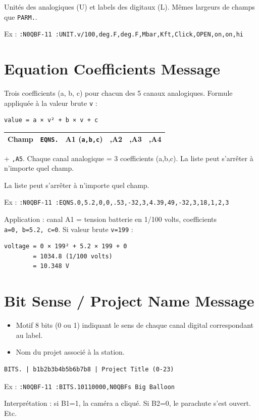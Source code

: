 Unités des analogiques (U) et labels des digitaux (L). Mêmes largeurs de
champs que \texttt{PARM.}.

Ex :
\texttt{:N0QBF-11\ :UNIT.v/100,deg.F,deg.F,Mbar,Kft,Click,OPEN,on,on,hi}

\section{Equation Coefficients
Message}\label{equation-coefficients-message}

Trois coefficients (a, b, c) pour chacun des 5 canaux analogiques.
Formule appliquée à la valeur brute \texttt{v} :

\begin{verbatim}
value = a × v² + b × v + c
\end{verbatim}

\begin{center}
\begin{tabular}{|c|c|c|c|c|c|}
\hline
\textbf{Champ} & \texttt{EQNS.} & A1 (\texttt{a,b,c}) & ,A2 & ,A3 & ,A4 \\
\hline
\end{tabular}
\end{center}
\noindent + \texttt{,A5}. Chaque canal analogique = 3 coefficients (a,b,c). La liste peut s'arrêter à n'importe quel champ.

La liste peut s'arrêter à n'importe quel champ.

Ex :
\texttt{:N0QBF-11\ :EQNS.0,5.2,0,0,.53,-32,3,4.39,49,-32,3,18,1,2,3}

Application : canal A1 = tension batterie en 1/100 volts, coefficients
\texttt{a=0,\ b=5.2,\ c=0}. Si valeur brute \texttt{v=199} :

\begin{verbatim}
voltage = 0 × 199² + 5.2 × 199 + 0
        = 1034.8 (1/100 volts)
        = 10.348 V
\end{verbatim}

\section{Bit Sense / Project Name
Message}\label{bit-sense-project-name-message}

\begin{itemize}
\tightlist
\item
  Motif 8 bits (0 ou 1) indiquant le sens de chaque canal digital
  correspondant au label.
\item
  Nom du projet associé à la station.
\end{itemize}

\begin{verbatim}
BITS. | b1b2b3b4b5b6b7b8 | Project Title (0-23)
\end{verbatim}

Ex :
\texttt{:N0QBF-11\ :BITS.10110000,N0QBF\textquotesingle{}s\ Big\ Balloon}

Interprétation : si B1=1, la caméra a cliqué. Si B2=0, le parachute
s'est ouvert. Etc.

